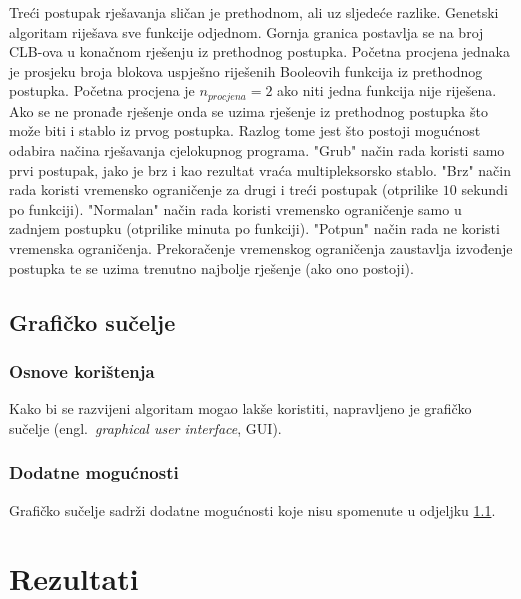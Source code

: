 \documentclass[times, utf8, diplomski]{fer}
\begin{document}
Treći postupak rješavanja sličan je prethodnom, ali uz sljedeće razlike. Genetski algoritam riješava sve funkcije odjednom. Gornja granica postavlja se na broj CLB-ova u konačnom rješenju iz prethodnog postupka. Početna procjena jednaka je prosjeku broja blokova uspješno riješenih Booleovih funkcija iz prethodnog postupka. Početna procjena je $n_{procjena}=2$ ako niti jedna funkcija nije riješena. Ako se ne pronađe rješenje onda se uzima rješenje iz prethodnog postupka što može biti i stablo iz prvog postupka. Razlog tome jest što postoji mogućnost odabira načina rješavanja cjelokupnog programa. "Grub" način rada koristi samo prvi postupak, jako je brz i kao rezultat vraća multipleksorsko stablo. "Brz" način rada koristi vremensko ograničenje za drugi i treći postupak (otprilike $10$ sekundi po funkciji). "Normalan" način rada koristi vremensko ograničenje samo u zadnjem postupku (otprilike minuta po funkciji). "Potpun" način rada ne koristi vremenska ograničenja. Prekoračenje vremenskog ograničenja zaustavlja izvođenje postupka te se uzima trenutno najbolje rješenje (ako ono postoji). 


\section{Grafičko sučelje} \label{sec:gui}

\subsection{Osnove korištenja} \label{subsec:osnove_koristenja}

Kako bi se razvijeni algoritam mogao lakše koristiti, napravljeno je grafičko sučelje (engl.~\textit{graphical user interface}, GUI).

\subsection{Dodatne mogućnosti}

Grafičko sučelje sadrži dodatne mogućnosti koje nisu spomenute u odjeljku \ref{subsec:osnove_koristenja}.


\chapter{Rezultati} \label{chapter:results}

\end{document}
